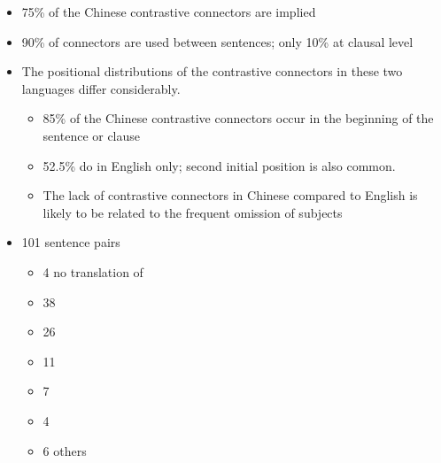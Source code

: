 \documentclass[a4paper,landscape,headrule,footrule,dvips]{foils}
\begin{document}
\begin{CJK}{UTF8}{min}
\begin{itemize}
\item 75\% of the Chinese contrastive connectors are implied
\item  90\% of connectors are used between sentences; only 10\%  at clausal level
\item  The positional distributions of the contrastive connectors in
these two languages differ considerably.
\begin{itemize}
\item  85\% of the Chinese contrastive connectors occur in the
beginning of the sentence or clause
\item 52.5\% do in English only; second initial position is also common.
\item The lack of contrastive connectors in Chinese compared to
  English is likely to be related to the frequent omission of subjects
\end{itemize}
\end{itemize}


\begin{itemize}
\item 101 sentence pairs
  \begin{itemize}
  \item 4  no translation of 
  \item 38   
  \item 26  
  \item 11  
  \item 7  
  \item 4  
  \item 6 others
  \end{itemize}
\end{itemize}



\end{CJK}
\end{document}

